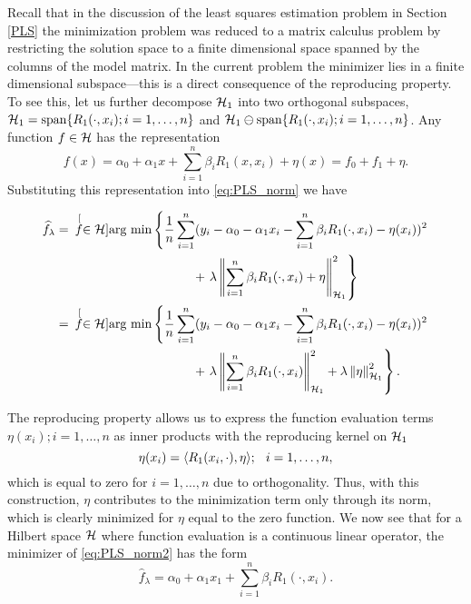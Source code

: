 Recall that in the discussion of the least squares estimation problem in Section \ref{PLS} the minimization problem was reduced to a matrix calculus problem by restricting the solution space to a finite dimensional space spanned by the columns of the model matrix. In the current problem the minimizer lies in a finite dimensional subspace---this is a direct consequence of the reproducing property. To see this, let us further decompose $\mathcal{H}_1$ into two orthogonal subspaces, $\mathcal{H}_1 =\mbox{span}\{R_1(\cdot,x_i); i = 1,\dots, n\}$ and $\mathcal{H}_1\ominus \mbox{span}\{R_1(\cdot,x_i); i = 1,\dots, n\}$. Any function $f \in  \mathcal{H}$  has the representation 
\begin{equation*}
f(x) = \alpha_0 + \alpha_1x + \sum_{i=1}^n \beta_iR_1(x, x_i) + \eta(x)=f_0 + f_{1} + \eta.
\label{eq:ds_representation} %
\end{equation*}
Substituting this representation into \eqref{eq:PLS_norm} we have 

\begin{align}
\widehat{f}_{\lambda} &= \hspace{.07in}\stackrel[f \in \mathcal{H}]{}{\mbox{arg min}} 
\left\{ \frac{1}{n}\sum_{i=1}^{n}(y_i - \alpha_0 - \alpha_1x_i - \sum_{i=1}^n \beta_iR_1(\cdot, x_i) - \eta(x_i))^2 \right. \nonumber \\
	 & \mbox{\hspace{1.5in}} + \left. \lambda\left\|\sum_{i=1}^n \beta_iR_1(\cdot, x_i) + \eta\right\|^2_{\mathcal{H}_1} \right\} \nonumber \\
	 & = \hspace{.07in}\stackrel[f \in \mathcal{H}]{}{\mbox{arg min}} \left\{ \frac{1}{n}\sum_{i=1}^{n}(y_i - \alpha_0 - \alpha_1x_i - \sum_{i=1}^n \beta_iR_1(\cdot, x_i) - \eta(x_i))^2 \right. \nonumber \\
  & \mbox{\hspace{1.5in}} + \left. \lambda\left\|\sum_{i=1}^n \beta_iR_1(\cdot, x_i) \right\|^2_{\mathcal{H}_1} + \lambda\left\|\eta\right\|^2_{\mathcal{H}_1} \right\}.
\label{eq:PLS_norm2}
\end{align}

The reproducing property allows us to express the function evaluation terms $\eta(x_i); i = 1,\dots, n$ as inner products with the reproducing kernel on $\mathcal{H}_1$
\begin{equation*}
\eta(x_i) = \langle R_1(x_i,\cdot), \eta \rangle; \hspace{0.1in} i = 1,\dots,n,
\label{eq:rep_property}
\end{equation*}
which is equal to zero for $i=1,\dots,n$ due to orthogonality. Thus, with this construction, $\eta$ contributes to the minimization term only through its norm, which is clearly minimized for $\eta$ equal to the zero function. We now see that for a Hilbert space $\mathcal{H}$ where function evaluation is a continuous linear operator, the minimizer of \eqref{eq:PLS_norm2} has the form 
\begin{equation}
\widehat{f}_{\lambda} = \alpha_0 + \alpha_1x_1 + \sum_{i=1}^n \beta_iR_1(\cdot, x_i).
\label{eq:solution_form}
\end{equation}

